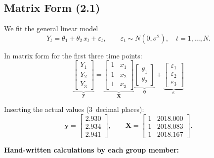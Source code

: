 \documentclass[11pt,a4paper]{article}
\begin{document}
\subsection{Matrix Form (2.1)}

We fit the general linear model
\begin{equation}
  Y_t = \theta_1 + \theta_2 \, x_t + \varepsilon_t, \qquad \varepsilon_t \sim N(0,\sigma^2), \quad t=1,\dots,N.
  \label{eq:glm}
\end{equation}

In matrix form for the first three time points:
\[
  \underbrace{
  \begin{bmatrix} Y_1 \\ Y_2 \\ Y_3 \end{bmatrix}
  }_{\boldsymbol{y}}
  =
  \underbrace{
  \begin{bmatrix} 1 & x_1 \\ 1 & x_2 \\ 1 & x_3 \end{bmatrix}
  }_{\boldsymbol{X}}
  \underbrace{
  \begin{bmatrix} \theta_1 \\ \theta_2 \end{bmatrix}
  }_{\boldsymbol{\theta}}
  +
  \underbrace{
  \begin{bmatrix} \varepsilon_1 \\ \varepsilon_2 \\ \varepsilon_3 \end{bmatrix}
  }_{\boldsymbol{\varepsilon}}
\]

Inserting the actual values (3~decimal places):
\[
  \boldsymbol{y} = \begin{bmatrix} 2.930 \\ 2.934 \\ 2.941 \end{bmatrix}, \qquad
  \boldsymbol{X} = \begin{bmatrix} 1 & 2018.000 \\ 1 & 2018.083 \\ 1 & 2018.167 \end{bmatrix}.
\]

\textbf{Hand-written calculations by each group member:}

\end{document}
